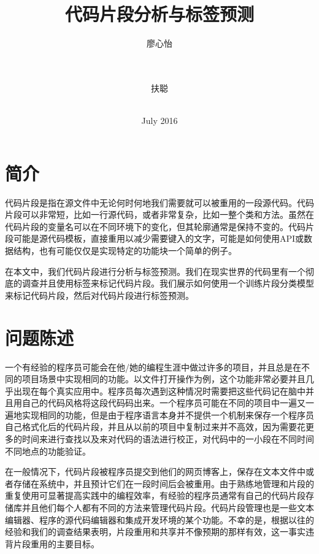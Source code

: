 \documentclass[10pt,journal,draftcls,onecolumn]{IEEEtran}
\begin{document}
\begin{CJK*}{UTF8}{gbsn}
\title{代码片段分析与标签预测}

\author{
 廖心怡\\
\\
\\
\and
{} 扶聪\\
\\
}
\date{July 2016}

\maketitle

\section{简介}
代码片段是指在源文件中无论何时何地我们需要就可以被重用的一段源代码。代码片段可以非常短，比如一行源代码，或者非常复杂，比如一整个类和方法。虽然在代码片段的变量名可以在不同环境下的变化，但其轮廓通常是保持不变的。代码片段可能是源代码模板，直接重用以减少需要键入的文字，可能是如何使用API或数据结构，也有可能仅仅是实现特定的功能块一个简单的例子。

在本文中，我们代码片段进行分析与标签预测。我们在现实世界的代码里有一个彻底的调查并且使用标签来标记代码片段。我们展示如何使用一个训练片段分类模型来标记代码片段，然后对代码片段进行标签预测。

\section{问题陈述}
一个有经验的程序员可能会在他/她的编程生涯中做过许多的项目，并且总是在不同的项目场景中实现相同的功能。以文件打开操作为例，这个功能非常必要并且几乎出现在每个真实应用中。程序员每次遇到这种情况时需要把这些代码记在脑中并且用自己的代码风格将这段代码码出来。一个程序员可能在不同的项目中一遍又一遍地实现相同的功能，但是由于程序语言本身并不提供一个机制来保存一个程序员自己格式化后的代码片段，并且从以前的项目中复制过来并不高效，因为需要花更多的时间来进行查找以及来对代码的语法进行校正，对代码中的一小段在不同时间不同地点的功能验证。

在一般情况下，代码片段被程序员提交到他们的网页博客上，保存在文本文件中或者存储在系统中，并且预计它们在一段时间后会被重用。由于熟练地管理和片段的重复使用可显著提高实践中的编程效率，有经验的程序员通常有自己的代码片段存储库并且他们每个人都有不同的方法来管理代码片段。代码片段管理也是一些文本编辑器、程序的源代码编辑器和集成开发环境的某个功能。不幸的是，根据以往的经验和我们的调查结果表明，片段重用和共享并不像预期的那样有效，这一事实违背片段重用的主要目标。


\end{CJK*}
\end{document}
